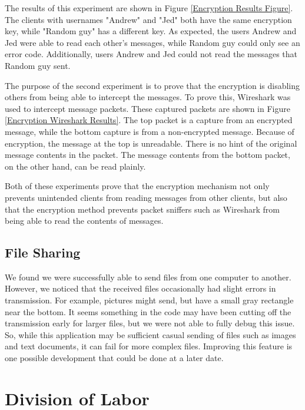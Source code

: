 \documentclass{article}
\begin{document}
The results of this experiment are shown in Figure \ref{Encryption Results Figure}. The clients with usernames "Andrew" and "Jed" both have the same encryption key, while "Random guy" has a different key. As expected, the users Andrew and Jed were able to read each other's messages, while Random guy could only see an error code. Additionally, users Andrew and Jed could not read the messages that Random guy sent. 

The purpose of the second experiment is to prove that the encryption is disabling others from being able to intercept the messages. To prove this, Wireshark was used to intercept message packets. These captured packets are shown in Figure \ref{Encryption Wireshark Results}. The top packet is a capture from an encrypted message, while the bottom capture is from a non-encrypted message. Because of encryption, the message at the top is unreadable. There is no hint of the original message contents in the packet. The message contents from the bottom packet, on the other hand, can be read plainly. 

Both of these experiments prove that the encryption mechanism not only prevents unintended clients from reading messages from other clients, but also that the encryption method prevents packet sniffers such as Wireshark from being able to read the contents of messages. 

\subsection{File Sharing}
We found we were successfully able to send files from one computer to another. However, we noticed that the received files occasionally had slight errors in transmission. For example, pictures might send, but have a small gray rectangle near the bottom. It seems something in the code may have been cutting off the transmission early for larger files, but we were not able to fully debug this issue. So, while this application may be sufficient casual sending of files such as images and text documents, it can fail for more complex files. Improving this feature is one possible development that could be done at a later date.


\section{Division of Labor}
\end{document}
